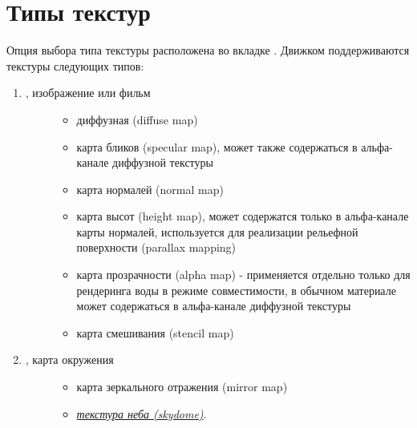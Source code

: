 \documentclass[a4paper,12pt,oneside]{sphinxmanual}
\begin{document}
\section{Типы текстур}
\label{textures:id2}\label{textures:index-1}
Опция выбора типа текстуры  расположена во вкладке . Движком поддерживаются текстуры следующих типов:
\begin{enumerate}
\item {} \begin{description}
\item[{, изображение или фильм}] \leavevmode\begin{itemize}
\item {} 
диффузная (diffuse map)

\item {} 
карта бликов (specular map), может также содержаться в альфа-канале диффузной текстуры

\item {} 
карта нормалей (normal map)

\item {} 
карта высот (height map), может содержатся только в альфа-канале карты нормалей, используется для реализации рельефной поверхности (parallax mapping)

\item {} 
карта прозрачности (alpha map) - применяется отдельно только для рендеринга воды в режиме совместимости, в обычном материале может содержаться в альфа-канале диффузной текстуры

\item {} 
карта смешивания (stencil map)

\end{itemize}

\end{description}

\item {} \begin{description}
\item[{, карта окружения}] \leavevmode\begin{itemize}
\item {} 
карта зеркального отражения (mirror map)

\item {} 
{\hyperref[textures:skydome-texture]{\emph{текстура неба (skydome)}}}.

\end{itemize}

\end{description}


\end{enumerate}
\end{document}
